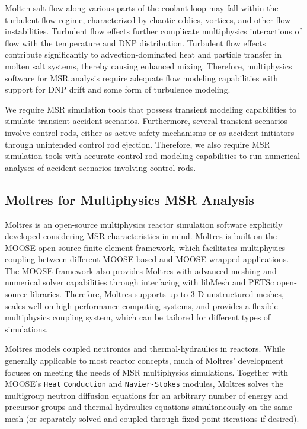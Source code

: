 Molten-salt flow along various parts of the coolant loop may fall within the turbulent flow
regime, characterized by chaotic eddies, vortices, and other flow instabilities.
Turbulent flow effects further complicate multiphysics interactions of flow with the temperature
and \gls{DNP} distribution. Turbulent flow effects contribute significantly to advection-dominated
heat and particle transfer in molten salt systems, thereby causing enhanced mixing. Therefore,
multiphysics software for \gls{MSR} analysis require adequate flow modeling capabilities with
support for \gls{DNP} drift and some form of turbulence modeling.

We require
\gls{MSR} simulation tools that possess transient modeling capabilities to simulate transient
accident scenarios. Furthermore, several transient scenarios involve control rods, either as active
safety mechanisms or as accident initiators through unintended control rod ejection. Therefore, we
also require \gls{MSR} simulation tools with accurate control rod modeling capabilities to run
numerical analyses of accident scenarios involving control rods.

\subsection{Moltres for Multiphysics \gls{MSR} Analysis}

Moltres \cite{lindsay_moltres_2017} is an open-source multiphysics reactor simulation software
explicitly developed considering \gls{MSR} characteristics in mind. Moltres is
built on the \gls{MOOSE} \cite{permann_moose_2020} open-source finite-element framework,
which facilitates multiphysics coupling between different
\gls{MOOSE}-based and \gls{MOOSE}-wrapped applications. The \gls{MOOSE} framework also provides
Moltres with advanced meshing and numerical solver capabilities through interfacing with libMesh
\cite{kirk_libmesh_2006} and PETSc \cite{satish_petsc_2019} open-source libraries. Therefore,
Moltres supports up to 3-D unstructured meshes, scales well on high-performance computing systems,
and provides a flexible multiphysics coupling system, which can be tailored for different types of
simulations.

Moltres models coupled neutronics and thermal-hydraulics in reactors. While
generally applicable to most reactor concepts, much of
Moltres' development focuses on meeting the needs of \gls{MSR} multiphysics simulations.
Together with \gls{MOOSE}'s \texttt{Heat}
\texttt{Conduction} and \texttt{Navier-Stokes} \cite{peterson_overview_2018}
modules, Moltres solves the multigroup neutron diffusion
equations for an arbitrary number of energy and precursor groups and
thermal-hydraulics equations simultaneously on the same mesh (or separately solved and coupled
through fixed-point iterations if desired).

